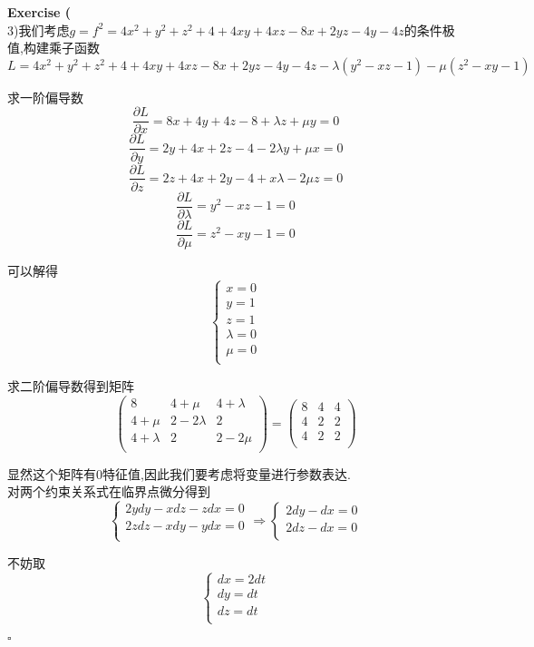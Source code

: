 \documentclass[11pt,hyperref,a4paper,UTF8]{ctexart}
\newenvironment{exercise}[1]{%
{\textbf{Exercise #1} \\ 
    }
}{
  \hfill $\square$ 
  \par\bigskip 
}
\begin{document}
\begin{CJK}{UTF8}{gkai}
\begin{exercise}{27}
    (3)我们考虑$g = f^2 = 4x^2 + y^2 + z^2 + 4 + 4xy + 4xz - 8x + 2yz - 4y - 4z$的条件极值,构建乘子函数
    \[L = 4x^2 + y^2 + z^2 + 4 + 4xy + 4xz - 8x + 2yz - 4y - 4z - \lambda(y^2 - xz - 1) - \mu(z^2 - xy - 1)\]

    求一阶偏导数
    \[\frac{\partial L}{\partial x} = 8x + 4y + 4z - 8 + \lambda z + \mu y = 0\]
    \[\frac{\partial L}{\partial y} = 2y + 4x + 2z - 4 - 2\lambda y + \mu x = 0\]
    \[\frac{\partial L}{\partial z} = 2z + 4x + 2y - 4 + x\lambda - 2\mu z = 0\]
    \[\frac{\partial L}{\partial \lambda} = y^2 - xz - 1 = 0\]
    \[\frac{\partial L}{\partial \mu} = z^2 - xy - 1 = 0\]

    可以解得
    \[\begin{cases}
        x = 0\\
        y = 1\\
        z = 1\\
        \lambda = 0\\
        \mu = 0\\
    \end{cases}\]

    求二阶偏导数得到矩阵
    \[\begin{pmatrix}
        8&4 + \mu&4 + \lambda\\
        4 + \mu&2 - 2\lambda&2\\
        4 + \lambda&2&2 - 2\mu\\
    \end{pmatrix} = \begin{pmatrix}
        8&4&4\\
        4&2&2\\
        4&2&2\\
    \end{pmatrix}\]

    显然这个矩阵有$0$特征值,因此我们要考虑将变量进行参数表达.\\

    对两个约束关系式在临界点微分得到
    \[\begin{cases}
        2ydy - xdz - zdx = 0\\
        2zdz - xdy - ydx = 0\\
    \end{cases} \Rightarrow
    \begin{cases}
        2dy - dx = 0\\
        2dz - dx = 0\\
    \end{cases}
    \]

    不妨取
    \[\begin{cases}
        dx = 2dt\\
        dy = dt\\
        dz = dt\\
    \end{cases}\]


\end{exercise}
\end{CJK}
\end{document}
